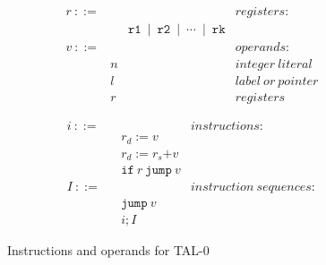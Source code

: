 \documentclass[a4paper,oneside]{ltjsarticle}
\begin{document}
\newpage
\begin{figure}[ht]
	\noindent\hrulefill

	\begin{minipage}[h]{.48\textwidth}
		\begin{align*}
			&r\ \mathtt{::=}&&&registers:&\\
			 &&&\mathtt{r1\ \mid\ r2\ \mid\ \cdots\ \mid\ rk}&&&\\
			 &v\ \mathtt{::=}&&&operands:&\\
			 &&n&&integer\ literal&\\
			 &&l&&label\ or\ pointer&\\
			 &&r&&registers&
		\end{align*}
	\end{minipage}\hfill
	\begin{minipage}[h]{.02\textwidth}
		\begin{center}
		\end{center}
	\end{minipage}
	\begin{minipage}[h]{.48\textwidth}
		\hfill\begin{align*}
			&i\ \mathtt{::=}&&&instructions:&\\
			 &&&r_d\mathtt{:=}v&&&\\
			 &&&r_d\mathtt{:=}r_s\mathtt{+}v&&&\\
			 &&&\mathtt{if}\ r\ \mathtt{jump}\ v&&&\\
			 &I\ \mathtt{::=}&&&instruction\ sequences:&\\
			 &&&\mathtt{jump}\ v&&&\\
			 &&&i;I&&&
		\end{align*}
	\end{minipage}

	\noindent\hrulefill
	\caption{Instructions and operands for TAL-0}
\end{figure}
\end{document}
